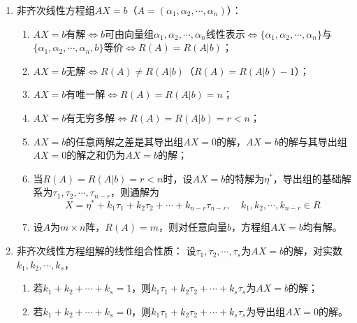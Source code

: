 \documentclass[UTF8]{ctexart}
\theoremstyle{remark}
\begin{document}
\begin{enumerate}
\item 非齐次线性方程组$AX=b$（$A=(\alpha_1,\alpha_2,\cdots,\alpha_n)$）：
\begin{enumerate}
	\item $AX=b$有解$\Leftrightarrow b$可由向量组$\alpha_1,\alpha_2,\cdots,\alpha_n$线性表示$\Leftrightarrow \{\alpha_1,\alpha_2,\cdots,\alpha_n\}$与$\{\alpha_1,\alpha_2,\cdots,\alpha_n,b\}$等价$\Leftrightarrow R(A)=R(A|b)$；
	\item $AX=b$无解$\Leftrightarrow R(A)\neq R(A|b)$（$R(A)=R(A|b)-1$）；
	\item $AX=b$有唯一解$\Leftrightarrow R(A)=R(A|b)=n$；
	\item $AX=b$有无穷多解$\Leftrightarrow R(A)=R(A|b)=r<n$；
	\item $AX=b$的任意两解之差是其导出组$AX=0$的解，$AX=b$的解与其导出组$AX=0$的解之和仍为$AX=b$的解；
	\item 当$R(A)=R(A|b)=r<n$时，设$AX=b$的特解为$\eta^*$，导出组的基础解系为$\tau_1,\tau_2,\cdots,\tau_{n-r}$，则通解为
	\[
	X=\eta^*+k_1\tau_1+k_2\tau_2+\cdots+k_{n-r}\tau_{n-r}, \quad k_1,k_2,\cdots,k_{n-r}\in R
	\]
	\item 设$A$为$m\times n$阵，$R(A)=m$，则对任意向量$b$，方程组$AX=b$均有解。
\end{enumerate}
\item 非齐次线性方程组解的线性组合性质：  
设\(\tau_1,\tau_2,\cdots,\tau_s\)为\(AX=b\)的解，对实数\(k_1,k_2,\cdots,k_s\)，  
\begin{enumerate}
	\item 若\(k_1+k_2+\cdots+k_s=1\)，则\(k_1\tau_1+k_2\tau_2+\cdots+k_s\tau_s\)为\(AX=b\)的解；  
	\item 若\(k_1+k_2+\cdots+k_s=0\)，则\(k_1\tau_1+k_2\tau_2+\cdots+k_s\tau_s\)为导出组\(AX=0\)的解。  
\end{enumerate}  
\end{enumerate}
\end{document}

